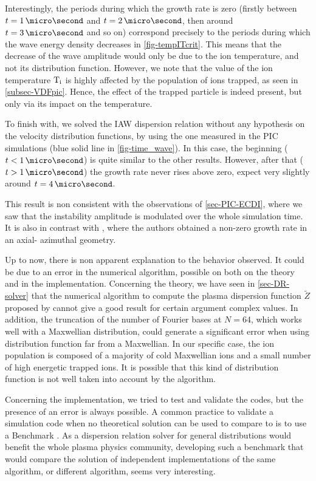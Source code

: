   Interestingly, the periods during which the growth rate is zero (firstly between $t=1\,\micro\second$ and $t=2\,\micro\second$, then around $t=3\,\micro\second$ and so on) correspond precisely to the periods during which the wave energy density decreases in \cref{fig-tempITcrit}.
  This means that the decrease of the wave amplitude would only be due to the ion temperature, and not its distribution function.
  However, we note that the value of the ion temperature $\mathrm{T_i}$ is highly affected by the population of ions trapped, as seen in \cref{subsec-VDFpic}.
  Hence, the effect of the trapped particle is indeed present, but only via its impact on the temperature.
  
  \vspace{1em}
  To finish with, we solved the \ac{IAW} dispersion relation without any hypothesis on the velocity distribution functions, by using the one measured in the PIC simulations (blue solid line in  \cref{fig-time_wave}).
  In this case, the beginning ($t < 1 \,\micro\second$) is quite similar to the other results.
  However, after that ($t > 1 \,\micro\second$) the growth rate never rises above zero, expect very slightly around $t=4\,\micro\second$.
  
  This result is non consistent with the observations of \cref{sec-PIC-ECDI}, where we saw that the instability amplitude is modulated over the whole simulation time.
  It is also in contrast with \citet{lafleur2018}, where the authors obtained a non-zero growth rate in an axial- azimuthal geometry.
  
  Up to now, there is non apparent explanation to the behavior observed.
  It could be due to an error in the numerical algorithm, possible on both on the theory and in the implementation.
  Concerning the theory, we have seen in \cref{sec-DR-solver} that the numerical algorithm to compute the plasma dispersion function $\tilde{Z}$ proposed by \citet{xie2013} cannot give a good result for certain argument complex values.
  In addition, the truncation of the number of Fourier bases at $N=64$, which works well with a Maxwellian distribution, could generate a significant error when using distribution function far from a Maxwellian.
  In our specific case, the ion population is composed of a majority of cold Maxwellian ions and a small number of high energetic trapped ions.
  It is possible that this kind of distribution function is not well taken into account by the algorithm.
  
  Concerning the implementation, we tried to test and validate the codes, but the presence of an error is always possible.
  A common practice to validate a simulation code when no theoretical solution can be used to compare to is to use a Benchmark \citep{turner2013}.
  As a dispersion relation solver for general distributions would benefit the whole plasma physics community, developing such a benchmark that would compare the solution of independent implementations of the same algorithm, or different algorithm, seems very interesting.
  
